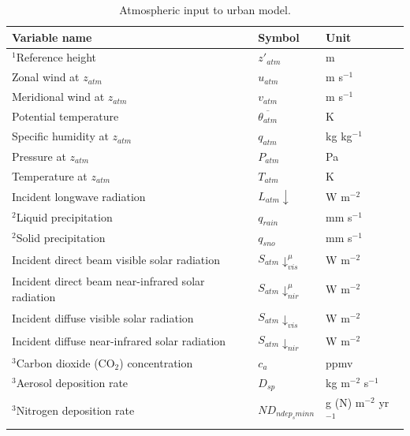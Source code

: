 \documentclass[12pt,authoryear]{elsarticle}
\numberwithin{equation}{section} %
\begin{document}
\begin{table}[H]
\centering
\caption{Atmospheric input to urban model.}
\label{tab:atmospheric_input}
\begin{tabular}{p{8cm}p{3cm}p{3cm}}
\toprule
Variable name & Symbol & Unit \\
\midrule
$^1$Reference height & $z'_{atm}$ & m \\
Zonal wind at $z_{atm}$ & $u_{atm}$ & m s$^{-1}$ \\
Meridional wind at $z_{atm}$ & $v_{atm}$ & m s$^{-1}$ \\
Potential temperature & $\overline{\theta_{atm}}$ & K \\
Specific humidity at $z_{atm}$ & $q_{atm}$ & kg kg$^{-1}$ \\
Pressure at $z_{atm}$ & $P_{atm}$ & Pa \\
Temperature at $z_{atm}$ & $T_{atm}$ & K \\
Incident longwave radiation & $L_{atm} \downarrow$ & W m$^{-2}$ \\
$^2$Liquid precipitation & $q_{rain}$ & mm s$^{-1}$ \\
$^2$Solid precipitation & $q_{sno}$ & mm s$^{-1}$ \\
Incident direct beam visible solar radiation & $S_{atm}\downarrow_{vis}^{\mu}$ & W m$^{-2}$ \\
Incident direct beam near-infrared solar radiation & $S_{atm}\downarrow_{nir}^{\mu}$ & W m$^{-2}$ \\
Incident diffuse visible solar radiation & $S_{atm}\downarrow_{vis}$ & W m$^{-2}$ \\
Incident diffuse near-infrared solar radiation & $S_{atm}\downarrow_{nir}$ & W m$^{-2}$ \\
$^3$Carbon dioxide (CO$_2$) concentration & $c_{a}$ & ppmv \\
$^3$Aerosol deposition rate & $D_{sp}$ & kg m$^{-2}$ s$^{-1}$ \\
$^3$Nitrogen deposition rate & $ND_{ndep_sminn}$ & g (N) m$^{-2}$ yr$^{-1}$ \\
\bottomrule
\end{tabular}
\end{table}
\end{document}
